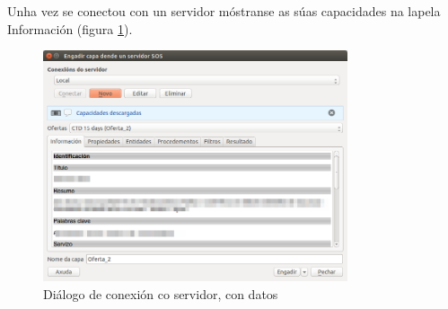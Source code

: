 Unha vez se conectou con un servidor móstranse as súas capacidades na lapela Información (figura \ref{fig:tabInfo}).
\begin{figure}[hbtp]
\centering
\includegraphics[width=0.8\textwidth]{images/manual/tabInfo.png}
\caption{Diálogo de conexión co servidor, con datos}
\label{fig:tabInfo}
\end{figure}

